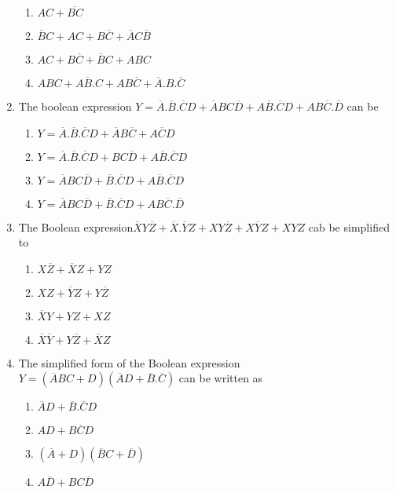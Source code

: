 \documentclass[journal,12pt,twocolumn]{IEEEtran}
\begin{document}
\begin{enumerate}
     \begin{enumerate}
      \item $AC+\overline{BC}$ 
      \item $\overline{B}C+AC+B\overline{C}+\overline{A}C\overline{B}$
      \item $AC+B\overline{C}+\overline{B}C+ABC$
      \item $ABC+A\overline{B}.C+AB\overline{C}+\overline{A}.B.\overline{C}$
    \end{enumerate}
    \item The boolean expression $Y=\overline{A}.\overline{B}.\overline{C}D+\overline{A}BC\overline{D}+A\overline{B}.\overline{C}
D+AB\overline{C}.\overline{D}$ can be
\begin{enumerate} 
      \item $Y=\overline{A}.\overline{B}.\overline{C}D+\overline{A}B\overline{C}+A\overline{C}D$
      \item $Y=\overline{A}.\overline{B}.\overline{C}D+BC\overline{D}+A\overline{B}.\overline{C}D$
      \item $Y=\overline{A}BC\overline{D}+\overline{B}.\overline{C}D+
A\overline{B}.\overline{C}D$
      \item $Y=\overline{A}BC\overline{D}+\overline{B}.\overline{C}D+
AB\overline{C}.\overline{D}$
    \end{enumerate}
 \item The Boolean expression$ \overline{X}Y\overline{Z}+\overline{X}.\overline{Y}Z+XY\overline{Z}
+X\overline{Y}Z+XYZ$ cab be simplified to
\begin{enumerate}
      \item $X\overline{Z}+\overline{X}Z+YZ$
      \item $XZ+\overline{Y}Z+Y\overline{Z}$
      \item $\overline{X}Y+YZ+XZ$
      \item $\overline{X}\overline{Y}+Y\overline{Z}+\overline{X}Z$
    \end{enumerate}
\item The simplified form of the Boolean expression $Y=(\overline{A}BC+D)(\overline{A}D+\overline{B}.\overline{C})$ can be written as
   \begin{enumerate}
      \item $\overline{A}D+\overline{B}.\overline{C}D$
      \item $AD+B\overline{C}D$
      \item $(\overline{A}+D)(\overline{B}C+\overline{D})$
      \item $A\overline{D}+BC\overline{D}$

\end{enumerate}
\end{enumerate}
\end{document}

